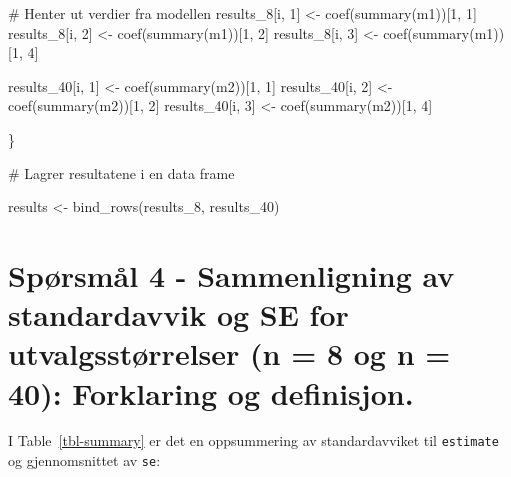 \documentclass[
  letterpaper,
  DIV=11,
  numbers=noendperiod]{scrreprt}
\newenvironment{Shaded}{\begin{snugshade}}{\end{snugshade}}
\newcommand{\CommentTok}[1]{\textcolor[rgb]{0.37,0.37,0.37}{#1}}
\newcommand{\DecValTok}[1]{\textcolor[rgb]{0.68,0.00,0.00}{#1}}
\newcommand{\FunctionTok}[1]{\textcolor[rgb]{0.28,0.35,0.67}{#1}}
\newcommand{\NormalTok}[1]{\textcolor[rgb]{0.00,0.23,0.31}{#1}}
\newcommand{\OtherTok}[1]{\textcolor[rgb]{0.00,0.23,0.31}{#1}}
\begin{document}
\begin{Shaded}
\begin{Highlighting}[]
  \CommentTok{\# Henter ut verdier fra modellen}
\NormalTok{  results\_8[i, }\DecValTok{1}\NormalTok{] }\OtherTok{\textless{}{-}} \FunctionTok{coef}\NormalTok{(}\FunctionTok{summary}\NormalTok{(m1))[}\DecValTok{1}\NormalTok{, }\DecValTok{1}\NormalTok{]}
\NormalTok{  results\_8[i, }\DecValTok{2}\NormalTok{] }\OtherTok{\textless{}{-}} \FunctionTok{coef}\NormalTok{(}\FunctionTok{summary}\NormalTok{(m1))[}\DecValTok{1}\NormalTok{, }\DecValTok{2}\NormalTok{]}
\NormalTok{  results\_8[i, }\DecValTok{3}\NormalTok{] }\OtherTok{\textless{}{-}} \FunctionTok{coef}\NormalTok{(}\FunctionTok{summary}\NormalTok{(m1))[}\DecValTok{1}\NormalTok{, }\DecValTok{4}\NormalTok{]}
  
\NormalTok{  results\_40[i, }\DecValTok{1}\NormalTok{] }\OtherTok{\textless{}{-}} \FunctionTok{coef}\NormalTok{(}\FunctionTok{summary}\NormalTok{(m2))[}\DecValTok{1}\NormalTok{, }\DecValTok{1}\NormalTok{]}
\NormalTok{  results\_40[i, }\DecValTok{2}\NormalTok{] }\OtherTok{\textless{}{-}} \FunctionTok{coef}\NormalTok{(}\FunctionTok{summary}\NormalTok{(m2))[}\DecValTok{1}\NormalTok{, }\DecValTok{2}\NormalTok{]}
\NormalTok{  results\_40[i, }\DecValTok{3}\NormalTok{] }\OtherTok{\textless{}{-}} \FunctionTok{coef}\NormalTok{(}\FunctionTok{summary}\NormalTok{(m2))[}\DecValTok{1}\NormalTok{, }\DecValTok{4}\NormalTok{]}
  
  
\NormalTok{\}}

\CommentTok{\# Lagrer resultatene i en data frame}

\NormalTok{results }\OtherTok{\textless{}{-}} \FunctionTok{bind\_rows}\NormalTok{(results\_8, results\_40)}
\end{Highlighting}
\end{Shaded}

\section{Spørsmål 4 - Sammenligning av standardavvik og SE for
utvalgsstørrelser (n = 8 og n = 40): Forklaring og
definisjon.}\label{spuxf8rsmuxe5l-4---sammenligning-av-standardavvik-og-se-for-utvalgsstuxf8rrelser-n-8-og-n-40-forklaring-og-definisjon.}

I Table~\ref{tbl-summary} er det en oppsummering av standardavviket til
\texttt{estimate} og gjennomsnittet av \texttt{se}:
\end{document}
